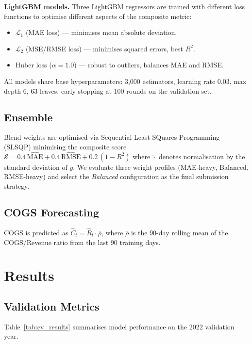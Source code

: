 \documentclass[10pt,a4paper]{article}
\begin{document}
\textbf{LightGBM models.}
Three LightGBM regressors are trained with different loss functions to
optimise different aspects of the composite metric:
\begin{itemize}[leftmargin=1.5em,itemsep=2pt]
  \item $\mathcal{L}_1$ (MAE loss) — minimises mean absolute deviation.
  \item $\mathcal{L}_2$ (MSE/RMSE loss) — minimises squared errors, best $R^2$.
  \item Huber loss ($\alpha=1.0$) — robust to outliers, balances MAE and RMSE.
\end{itemize}
All models share base hyperparameters: 3,000 estimators, learning rate 0.03,
max depth 6, 63 leaves, early stopping at 100 rounds on the validation set.

\subsection{Ensemble}

Blend weights are optimised via Sequential Least SQuares Programming (SLSQP)
minimising the composite score $\mathcal{S} = 0.4\,\hat{\text{MAE}} + 0.4\,\hat{\text{RMSE}} + 0.2\,(1-R^2)$
where $\hat{\cdot}$ denotes normalisation by the standard deviation of $y$.
We evaluate three weight profiles (MAE-heavy, Balanced, RMSE-heavy) and
select the \textit{Balanced} configuration as the final submission strategy.

\subsection{COGS Forecasting}

COGS is predicted as $\hat{C}_t = \hat{R}_t \cdot \bar{\rho}$, where
$\bar{\rho}$ is the 90-day rolling mean of the COGS/Revenue ratio
from the last 90 training days.

\section{Results}
\label{sec:results}

\subsection{Validation Metrics}

Table~\ref{tab:cv_results} summarises model performance on the 2022
validation year.
\end{document}
